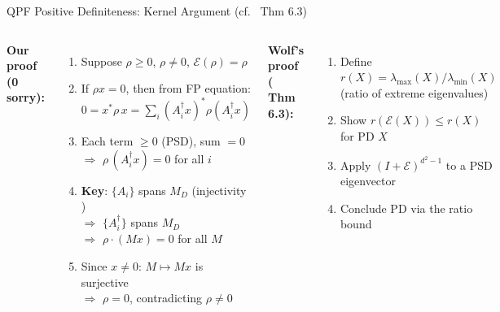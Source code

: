 \documentclass[aspectratio=169,10pt]{beamer}
\begin{document}
\begin{frame}{QPF Positive Definiteness: Kernel Argument \textnormal{(cf.\ \cite{Wolf2012Quantum} Thm 6.3)}}
    \vspace{-0.3em}

    \begin{columns}[T]
        \textbf{\textcolor{leangreen}{Our proof} (0 sorry):}
        \begin{enumerate}\itemsep0.12em\small
            \item Suppose $\rho \geq 0$, $\rho \neq 0$, $\mathcal{E}(\rho) = \rho$
            \item If $\rho x = 0$, then from FP equation:\\
                $0 = x^* \rho\, x = \sum_i (A_i^\dagger x)^* \rho (A_i^\dagger x)$
            \item Each term $\geq 0$ (PSD), sum $= 0$\\
                $\Rightarrow$ $\rho\,(A_i^\dagger x) = 0$ for all $i$
            \item \textbf{Key}: $\{A_i\}$ spans $M_D$ (injectivity \cite{Perez-Garcia2007Matrix})\\
                $\Rightarrow$ $\{A_i^\dagger\}$ spans $M_D$\\
                $\Rightarrow$ $\rho \cdot (M x) = 0$ for all $M$
            \item Since $x \neq 0$: $M \mapsto Mx$ is surjective\\
                $\Rightarrow$ $\rho = 0$, contradicting $\rho \neq 0$
        \end{enumerate}

        \textbf{\textcolor{dimwhite}{Wolf's proof} (\cite{Wolf2012Quantum} Thm 6.3):}
        \begin{enumerate}\itemsep0.12em\small\color{dimwhite}
            \item Define $r(X) = \lambda_{\max}(X) / \lambda_{\min}(X)$\\
                {\tiny (ratio of extreme eigenvalues)}
            \item Show $r(\mathcal{E}(X)) \leq r(X)$ for PD $X$
            \item Apply $(I + \mathcal{E})^{d^2-1}$ to a PSD eigenvector
            \item Conclude PD via the ratio bound
        \end{enumerate}


\end{columns}
\end{frame}
\end{document}

